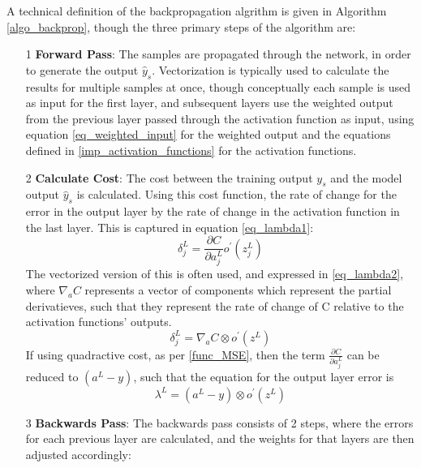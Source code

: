 \documentclass[a4paper,11pt,oneside]{article}
\theoremstyle{plain}
\theoremstyle{definition}
\begin{document}
A technical definition of the backpropagation algrithm is given in Algorithm \ref{algo_backprop}, though the three primary steps of the algorithm are:\newline
\begin{itemize}
	\item [1] \textbf{Forward Pass}: The samples are propagated through the network, in order to generate the output $\hat{y}_s$. Vectorization is typically used to calculate the results for multiple samples at once, though conceptually each sample is used as input for the first layer, and subsequent layers use the weighted output from the previous layer passed through the activation function as input, using equation \eqref{eq_weighted_input} for the weighted output and the equations defined in \ref{imp_activation_functions} for the activation functions.
	\newline
	\item [2] \textbf{Calculate Cost}: The cost between the training output $y_s$ and the model output $\hat{y}_s$ is calculated. Using this cost function, the rate of change for the error in the output layer by the rate of change in the activation function in the last layer. This is captured in equation \eqref{eq_lambda1}:	
		\begin{equation}\label{eq_lambda1}
		\delta_{j}^{L}=\frac{\partial C}{\partial a_{j}^{L}} o^{\prime}\left(z_{j}^{L}\right)
		\end{equation}
	The vectorized version of this is often used, and expressed in \eqref{eq_lambda2}, where $\nabla_a C$ represents a vector of components which represent the partial derivatieves, such that they represent the rate of change of C relative to the activation functions' outputs.
		\begin{equation}\label{eq_lambda2}
		\delta_{j}^{L}=\nabla_a C \otimes o^{\prime}(z^L)
		\end{equation}
	If using quadractive cost, as per \ref{func_MSE}, then the term $\frac{\partial C}{\partial a_{j}^{L}}$ can be reduced to $(a^L - y)$, such that the equation for the output layer error is
	\begin{equation}\label{eq_lambda3}
				\lambda^L = (a^L - y) \otimes o^{\prime}(z^L)
	\end{equation}
	\newline		
	\item [3] \textbf{Backwards Pass}: The backwards pass consists of 2 steps, where the errors for each previous layer are calculated, and the weights for that layers are then adjusted accordingly:

\end{itemize}
\end{document}
